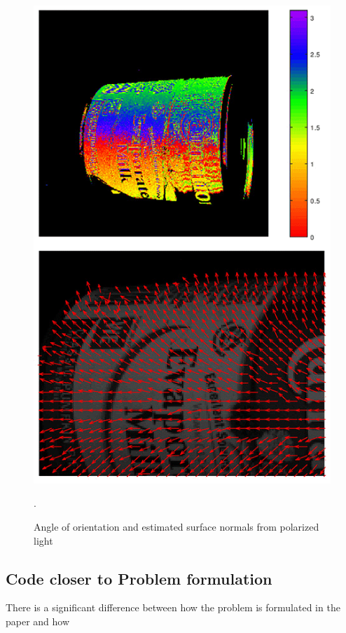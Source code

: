 \begin{figure}
    \centering
    \includegraphics[width=\linewidth]{images/polarization_normals.png}
    \caption{Angle of orientation and estimated surface normals from polarized light \cite{lucidvisionlabs3DDepthSurface2021}}.
    \label{fig:polarization}
\end{figure}






\subsection{Code closer to Problem formulation}
There is a significant difference between how the problem is formulated in the paper and how
